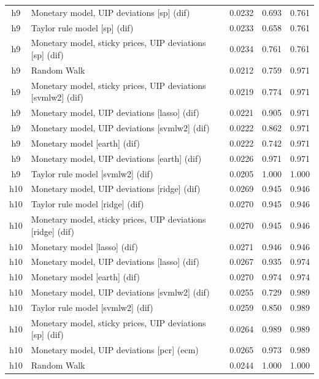 \begin{ThreePartTable}
\begin{longtable}[t]{cp{5.5cm}ccc}
h9 & \raggedright Monetary model, UIP deviations [sp] (dif) & 0.0232 & 0.693 & 0.761\\
h9 & \raggedright Taylor rule model [sp] (dif) & 0.0233 & 0.658 & 0.761\\
h9 & \raggedright Monetary model, sticky prices, UIP deviations [sp] (dif) & 0.0234 & 0.761 & 0.761\\
h9 & \raggedright Random Walk & 0.0212 & 0.759 & 0.971\\
h9 & \raggedright Monetary model, sticky prices, UIP deviations [svmlw2] (dif) & 0.0219 & 0.774 & 0.971\\
h9 & \raggedright Monetary model, UIP deviations [lasso] (dif) & 0.0221 & 0.905 & 0.971\\
h9 & \raggedright Monetary model, UIP deviations [svmlw2] (dif) & 0.0222 & 0.862 & 0.971\\
h9 & \raggedright Monetary model [earth] (dif) & 0.0222 & 0.742 & 0.971\\
h9 & \raggedright Monetary model, UIP deviations [earth] (dif) & 0.0226 & 0.971 & 0.971\\
h9 & \raggedright Taylor rule model [svmlw2] (dif) & 0.0205 & 1.000 & 1.000\\
\addlinespace
h10 & \raggedright Monetary model, UIP deviations [ridge] (dif) & 0.0269 & 0.945 & 0.946\\
h10 & \raggedright Taylor rule model [ridge] (dif) & 0.0270 & 0.945 & 0.946\\
h10 & \raggedright Monetary model, sticky prices, UIP deviations [ridge] (dif) & 0.0270 & 0.945 & 0.946\\
h10 & \raggedright Monetary model [lasso] (dif) & 0.0271 & 0.946 & 0.946\\
h10 & \raggedright Monetary model, UIP deviations [lasso] (dif) & 0.0267 & 0.935 & 0.974\\
h10 & \raggedright Monetary model [earth] (dif) & 0.0270 & 0.974 & 0.974\\
h10 & \raggedright Monetary model, UIP deviations [svmlw2] (dif) & 0.0255 & 0.729 & 0.989\\
h10 & \raggedright Taylor rule model [svmlw2] (dif) & 0.0259 & 0.850 & 0.989\\
h10 & \raggedright Monetary model, sticky prices, UIP deviations [sp] (dif) & 0.0264 & 0.989 & 0.989\\
h10 & \raggedright Monetary model, UIP deviations [pcr] (ecm) & 0.0265 & 0.973 & 0.989\\
h10 & \raggedright Random Walk & 0.0244 & 1.000 & 1.000\\

\end{longtable}
\end{ThreePartTable}
